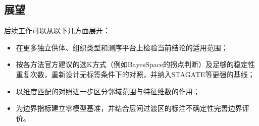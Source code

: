 \subsection{展望}
后续工作可以从以下几方面展开：
\begin{itemize}
  \item 在更多独立供体、组织类型和测序平台上检验当前结论的适用范围；
  \item 按各方法官方建议的选K方式（例如BayesSpace的拐点判断）及足够的稳定性重复次数，重新设计无标签条件下的对照，并纳入STAGATE等更强的基线；
  \item 以维度匹配的对照进一步区分邻域范围与特征维数的作用；
  \item 为边界指标建立零模型基准，并结合层间过渡区的标注不确定性完善边界评价。
\end{itemize}

